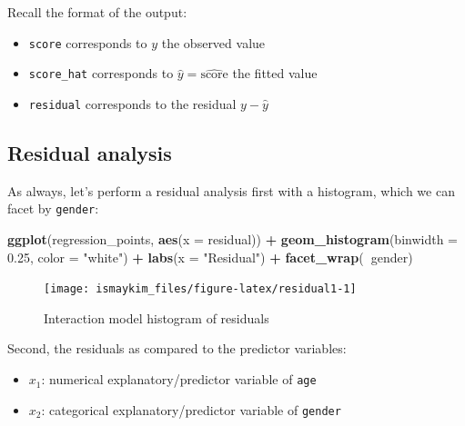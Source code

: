 \documentclass[12pt,]{krantz}
\makeatletter
\newenvironment{Shaded}{\begin{snugshade}}{\end{snugshade}}
\newcommand{\KeywordTok}[1]{\textcolor[rgb]{0.27,0.27,0.27}{\textbf{#1}}}
\newcommand{\DataTypeTok}[1]{\textcolor[rgb]{0.27,0.27,0.27}{#1}}
\newcommand{\FloatTok}[1]{\textcolor[rgb]{0.06,0.06,0.06}{#1}}
\newcommand{\StringTok}[1]{\textcolor[rgb]{0.5,0.5,0.5}{#1}}
\newcommand{\OperatorTok}[1]{\textcolor[rgb]{0.43,0.43,0.43}{\textbf{#1}}}
\newcommand{\NormalTok}[1]{#1}
\providecommand{\tightlist}{%
  \setlength{\itemsep}{0pt}\setlength{\parskip}{0pt}}
\newenvironment{kframe}{%
\medskip{}
\setlength{\fboxsep}{.8em}
 \def\at@end@of@kframe{}%
 \ifinner\ifhmode%
  \def\at@end@of@kframe{\end{minipage}}%
  \begin{minipage}{\columnwidth}%
 \fi\fi%
 \def\FrameCommand##1{\hskip\@totalleftmargin \hskip-\fboxsep
 \colorbox{shadecolor}{##1}\hskip-\fboxsep
     \hskip-\linewidth \hskip-\@totalleftmargin \hskip\columnwidth}%
 \MakeFramed {\advance\hsize-\width
   \@totalleftmargin\z@ \linewidth\hsize
   \@setminipage}}%
 {\par\unskip\endMakeFramed%
 \at@end@of@kframe}
\renewenvironment{Shaded}{\begin{kframe}}{\end{kframe}}
\theoremstyle{definition}
\theoremstyle{definition}
\theoremstyle{definition}
\theoremstyle{remark}
\makeatother
\begin{document}
Recall the format of the output:

\begin{itemize}
\tightlist
\item
  \texttt{score} corresponds to \(y\) the observed value
\item
  \texttt{score\_hat} corresponds to
  \(\widehat{y} = \widehat{\mbox{score}}\) the fitted value
\item
  \texttt{residual} corresponds to the residual \(y - \widehat{y}\)
\end{itemize}

\subsection{Residual analysis}\label{model4residuals}

As always, let's perform a residual analysis first with a histogram,
which we can facet by \texttt{gender}:

\begin{Shaded}
\begin{Highlighting}[]
\KeywordTok{ggplot}\NormalTok{(regression_points, }\KeywordTok{aes}\NormalTok{(}\DataTypeTok{x =}\NormalTok{ residual)) }\OperatorTok{+}
\StringTok{  }\KeywordTok{geom_histogram}\NormalTok{(}\DataTypeTok{binwidth =} \FloatTok{0.25}\NormalTok{, }\DataTypeTok{color =} \StringTok{"white"}\NormalTok{) }\OperatorTok{+}
\StringTok{  }\KeywordTok{labs}\NormalTok{(}\DataTypeTok{x =} \StringTok{"Residual"}\NormalTok{) }\OperatorTok{+}
\StringTok{  }\KeywordTok{facet_wrap}\NormalTok{(}\OperatorTok{~}\NormalTok{gender)}
\end{Highlighting}
\end{Shaded}

\begin{figure}

{\centering \texttt{[image: ismaykim\_files/figure-latex/residual1-1]} 

}

\caption{Interaction model histogram of residuals}\label{fig:residual1}
\end{figure}

Second, the residuals as compared to the predictor variables:

\begin{itemize}
\tightlist
\item
  \(x_1\): numerical explanatory/predictor variable of \texttt{age}
\item
  \(x_2\): categorical explanatory/predictor variable of \texttt{gender}
\end{itemize}
\end{document}
